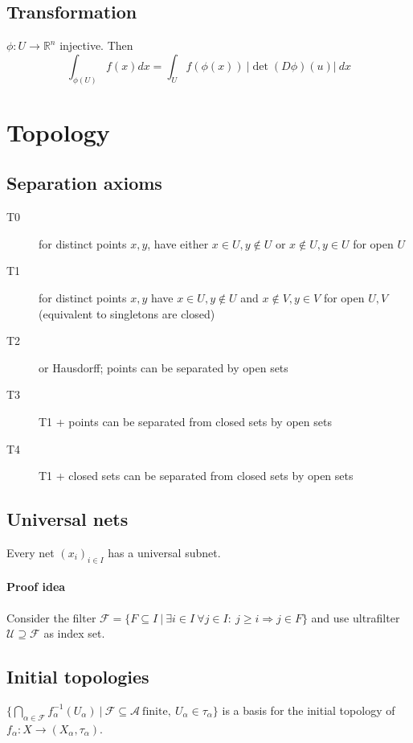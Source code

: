 \documentclass{scrartcl}
\begin{document}
\subsection{Transformation}
$\phi: U \to \mathbb{R}^n$ injective. Then
\begin{equation}
    \int_{\phi(U)} f(x) dx = \int_U f(\phi(x)) \ |\det(D\phi)(u)| \ dx \nonumber
\end{equation}

\section{Topology}

\subsection{Separation axioms}
\begin{description}
    \item[T0] for distinct points $x, y$, have either $x \in U, y \notin U$ or $x \notin U, y \in U$ for open $U$
    \item[T1] for distinct points $x, y$ have $x \in U, y \notin U$ and $x \notin V, y \in V$ for open $U, V$ (equivalent to singletons are closed)
    \item[T2] or Hausdorff; points can be separated by open sets
    \item[T3] T1 + points can be separated from closed sets by open sets
    \item[T4] T1 + closed sets can be separated from closed sets by open sets
\end{description}

\subsection{Universal nets}
Every net $(x_i)_{i \in I}$ has a universal subnet.
\paragraph{Proof idea} 
Consider the filter $\mathcal{F} = \{F \subseteq I \ | \ \exists i \in I \ \forall j \in I: \ j \geq i \Rightarrow j \in F\}$ and use ultrafilter $\mathcal{U} \supseteq \mathcal{F}$ as index set.

\subsection{Initial topologies}
$\{ \bigcap_{\alpha \in \mathcal{F}} f_\alpha^{-1}(U_\alpha) \ | \ \mathcal{F} \subseteq \mathcal{A} \ \text{finite}, \ U_\alpha \in \tau_\alpha \}$ is a basis for the initial topology of $f_\alpha: X \to (X_\alpha, \tau_\alpha)$.
\end{document}
